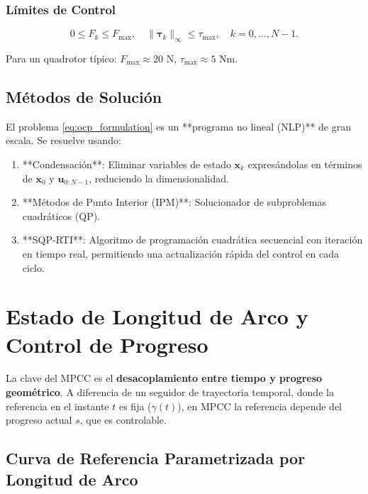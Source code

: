 \documentclass[11pt,a4paper]{article}
\begin{document}
\subsubsection{Límites de Control}

\begin{equation}
    0 \leq F_k \leq F_{\max}, \quad \|\boldsymbol{\tau}_k\|_\infty \leq \tau_{\max}, \quad k = 0, \ldots, N-1.
\end{equation}

Para un quadrotor típico: $F_{\max} \approx 20$ N, $\tau_{\max} \approx 5$ Nm.

\subsection{Métodos de Solución}

El problema \eqref{eq:ocp_formulation} es un **programa no lineal (NLP)** de gran escala. Se resuelve usando:

\begin{enumerate}
    \item **Condensación**: Eliminar variables de estado $\mathbf{x}_k$ expresándolas en términos de $\mathbf{x}_0$ y $\mathbf{u}_{0:N-1}$, reduciendo la dimensionalidad.
    \item **Métodos de Punto Interior (IPM)**: Solucionador de subproblemas cuadráticos (QP).
    \item **SQP-RTI**: Algoritmo de programación cuadrática secuencial con iteración en tiempo real, permitiendo una actualización rápida del control en cada ciclo.
\end{enumerate}

\section{Estado de Longitud de Arco y Control de Progreso}
\label{sec:arc_length_progress}

La clave del MPCC es el \textbf{desacoplamiento entre tiempo y progreso geométrico}. A diferencia de un seguidor de trayectoria temporal, donde la referencia en el instante $t$ es fija ($\gamma(t)$), en MPCC la referencia depende del progreso actual $s$, que es controlable.

\subsection{Curva de Referencia Parametrizada por Longitud de Arco}
\end{document}
